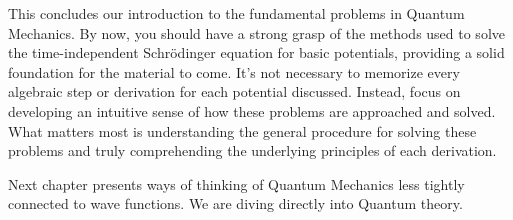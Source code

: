 This concludes our introduction to the fundamental problems in Quantum
Mechanics. By now, you should have a strong grasp of the methods used to solve
the time-independent Schrödinger equation for basic potentials, providing
a solid foundation for the material to come. It's not necessary to memorize
every algebraic step or derivation for each potential discussed. Instead, focus
on developing an intuitive sense of how these problems are approached and
solved. What matters most is understanding the general procedure for solving
these problems and truly comprehending the underlying principles of each
derivation. 

Next chapter presents ways of thinking of
Quantum Mechanics less tightly connected to wave functions. We are diving
directly into Quantum theory. 
